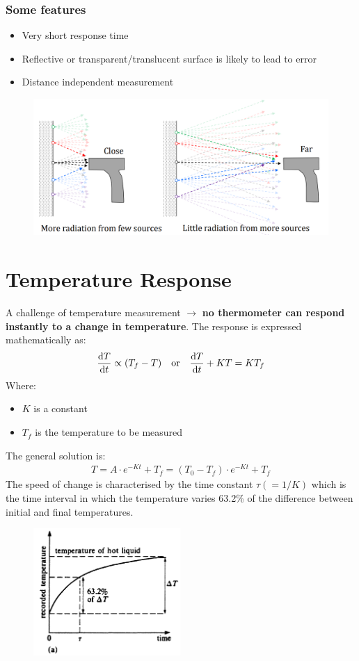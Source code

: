 \documentclass[class=report, crop=false, 12pt,a4paper]{standalone}
\begin{document}
\subsubsection{Some features}
\begin{itemize}
  \item Very short response time
  \item Reflective or transparent/translucent surface is likely to lead to error
  \item Distance independent measurement
\end{itemize}
\begin{figure}[H]
  \centering
  \includegraphics[width = 1\textwidth]{../img/Mdiagram74.png}
\end{figure}
\section{Temperature Response}
A challenge of temperature measurement $\longrightarrow$ \textbf{no thermometer can respond instantly to a change in temperature}. The response is expressed mathematically as:
\begin{gather}
  \frac{\dif T}{\dif t} \propto (T_f-T) \ \ \ \text{or} \ \ \ \frac{\dif T}{\dif t}+KT = KT_f
\end{gather}
Where:
\begin{itemize}
  \item $K$ is a constant 
  \item $T_f$ is the temperature to be measured
\end{itemize}
The general solution is: 
\begin{gather}
  T = A\cdot e^{-Kt}+T_f = (T_0-T_f)\cdot e^{-Kt} + T_f
\end{gather}
The speed of change is characterised by the time constant $\tau (=1/K)$ which is the time interval in which the temperature varies 63.2\% of the difference between initial and final temperatures.
\begin{figure}[H]
  \centering
  \includegraphics[width = 0.5\textwidth]{../img/Mdiagram75.png}
\end{figure}
\end{document}
